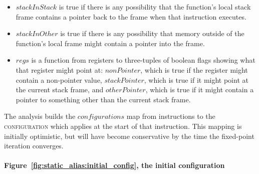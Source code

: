 \begin{itemize}
\item $\mathit{stackInStack}$ is true if there is any possibility that
  the function's local stack frame contains a pointer back to the
  frame when that instruction executes.
\item $\mathit{stackInOther}$ is true if there is any possibility that
  memory outside of the function's local frame might contain a pointer
  into the frame.
\item $\mathit{regs}$ is a function from registers to three-tuples of
  boolean flags showing what that register might point at:
  $\mathit{nonPointer}$, which is true if the register might contain a
  non-pointer value, $\mathit{stackPointer}$, which is true if it
  might point at the current stack frame, and $\mathit{otherPointer}$,
  which is true if it might contain a pointer to something other than
  the current stack frame.
\end{itemize}

The analysis builds the $\mathit{configurations}$ map from
instructions to the \textsc{configuration} which applies at the start
of that instruction.  This mapping is initially optimistic, but will
have become conservative by the time the fixed-point iteration
converges.

\paragraph{Figure~\ref{fig:static_alias:initial_config}, the initial configuration}


